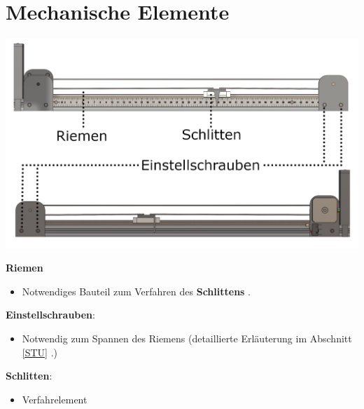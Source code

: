 %
%

\chapter{Mechanische Elemente}
\begin{center}
	
	\includegraphics[width=\textwidth]{Images/Konstruktion4.png}
\end{center}
	\textbf{Riemen}
\begin{itemize}
	\item Notwendiges Bauteil zum Verfahren des \textbf{Schlittens} .
\end{itemize}
\textbf{Einstellschrauben}: 
\begin{itemize}
	\item Notwendig zum Spannen des Riemens (detaillierte Erläuterung im Abschnitt \ref{STU} .) 
\end{itemize}
\textbf{Schlitten}: 
\begin{itemize}
	\item Verfahrelement  
\end{itemize}



